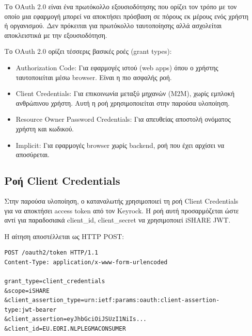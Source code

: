 Το \textlatin{OAuth 2.0} είναι ένα πρωτόκολλο
εξουσιοδότησης που ορίζει τον τρόπο με τον οποίο μια εφαρμογή μπορεί
να αποκτήσει πρόσβαση σε πόρους εκ μέρους ενός χρήστη ή οργανισμού.
Δεν πρόκειται για πρωτόκολλο ταυτοποίησης αλλά ασχολείται αποκλειστικά
με την εξουσιοδότηση.

Το \textlatin{OAuth 2.0} ορίζει τέσσερις βασικές ροές (\textlatin{grant
types}):

\begin{itemize}
    \item \textlatin{Authorization Code}: Για εφαρμογές ιστού
    (\textlatin{web apps}) όπου ο χρήστης ταυτοποιείται μέσω
    \textlatin{browser}. Είναι η πιο ασφαλής ροή.
    \item \textlatin{Client Credentials}: Για επικοινωνία μεταξύ
    μηχανών (\textlatin{M2M}), χωρίς εμπλοκή ανθρώπινου χρήστη. Αυτή
    η ροή χρησιμοποιείται στην παρούσα υλοποίηση.
    \item \textlatin{Resource Owner Password Credentials}:
    Για απευθείας αποστολή ονόματος χρήστη και κωδικού.
    \item \textlatin{Implicit}: Για εφαρμογές \textlatin{browser}
    χωρίς \textlatin{backend}, ροή που έχει αρχίσει να αποσύρεται.
\end{itemize}

\subsection{Ροή \textlatin{Client Credentials }}
\label{subsec:client-credentials}

Στην παρούσα υλοποίηση, ο καταναλωτής χρησιμοποιεί τη ροή
\textlatin{Client Credentials} για να αποκτήσει \textlatin{access
token} από τον \textlatin{Keyrock}. Η ροή αυτή προσαρμόζεται ώστε
αντί για παραδοσιακά \textlatin{client\_id, client\_secret} να
χρησιμοποιεί \textlatin{iSHARE JWT}.

Η αίτηση αποστέλλεται ως \textlatin{HTTP POST}:

\begin{lstlisting}[language={}, caption={Αίτηση OAuth 2.0 Client Credentials με iSHARE JWT.}]
POST /oauth2/token HTTP/1.1
Content-Type: application/x-www-form-urlencoded

grant_type=client_credentials
&scope=iSHARE
&client_assertion_type=urn:ietf:params:oauth:client-assertion-type:jwt-bearer
&client_assertion=eyJhbGciOiJSUzI1NiIs...
&client_id=EU.EORI.NLPLEGMACONSUMER
\end{lstlisting}

